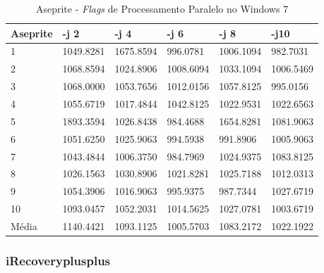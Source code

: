 \begin{apendicesenv}
\begin{table}[!ht]
\centering
\tiny
\caption{Aseprite - \textit{Flags} de Processamento Paralelo no Windows 7}
\label{tab:flag_processamento_paralelo:windows:aseprite}
\begin{tabular}{llllll}
\textbf{Aseprite} & \textbf{-j 2} & \textbf{-j 4} & \textbf{-j 6} & \textbf{-j 8} & \textbf{-j10}  \\ \toprule
1                 & 1049.8281     &   1675.8594   &   996.0781    &   1006.1094   &   982.7031     \\ 
2                 & 1068.8594     &   1024.8906   &   1008.6094   &   1033.1094   &   1006.5469    \\ 
3                 & 1068.0000     &   1053.7656   &   1012.0156   &   1057.8125   &   995.0156     \\ 
4                 & 1055.6719     &   1017.4844   &   1042.8125   &   1022.9531   &   1022.6563    \\ 
5                 & 1893.3594     &   1026.8438   &   984.4688    &   1654.8281   &   1081.9063    \\ 
6                 & 1051.6250     &   1025.9063   &   994.5938    &   991.8906    &   1005.9063    \\ 
7                 & 1043.4844     &   1006.3750   &   984.7969    &   1024.9375   &   1083.8125    \\ 
8                 & 1026.1563     &   1030.8906   &   1021.8281   &   1025.7188   &   1012.0313    \\ 
9                 & 1054.3906     &   1016.9063   &   995.9375    &   987.7344    &   1027.6719    \\ 
10                & 1093.0457     &   1052.2031   &   1014.5625   &   1027.0781   &   1003.6719    \\ \bottomrule
Média             & 1140.4421     &   1093.1125   &   1005.5703   &   1083.2172   &   1022.1922    \\ 
\end{tabular}
\end{table}

\clearpage
\subsubsection*{iRecoveryplusplus}


\end{apendicesenv}
